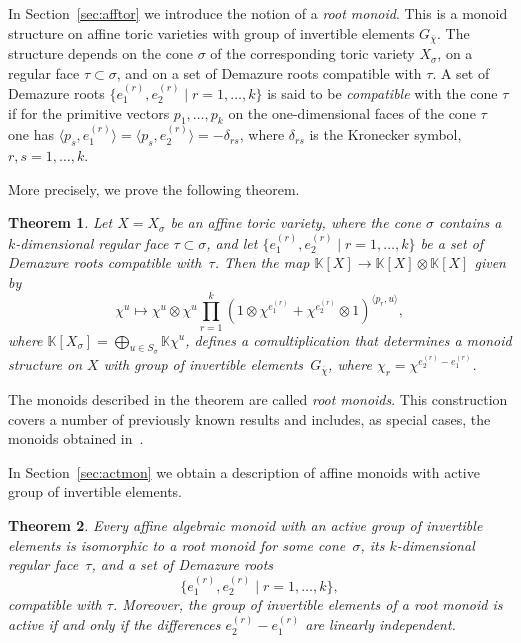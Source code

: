 \documentclass[a4paper, 11pt]{amsart}
\theoremstyle{plain}
\newtheorem{theorem}{Theorem}[section]
\theoremstyle{remark}
\theoremstyle{definition}
\newcommand{\KK}{\mathbb{K}}
\newcommand{\GG}{G_{\overline{\chi}}}
\begin{document}
In Section~\ref{sec:afftor} we introduce the notion of a \textit{root monoid}. This is a monoid structure on affine toric varieties with group of invertible elements $\GG$. The structure depends on the cone $\sigma$ of the corresponding toric variety $X_\sigma$, on a regular face $\tau \subset \sigma$, and on a set of Demazure roots compatible with $\tau$. A set of Demazure roots $\{e_1^{(r)}, e_2^{(r)} \mid r = 1,\ldots,k\}$ is said to be \emph{compatible} with the cone $\tau$ if for the primitive vectors $p_1, \ldots, p_k$ on the one-dimensional faces of the cone $\tau$ one has $\langle p_s, e_1^{(r)} \rangle = \langle p_s, e_2^{(r)} \rangle = -\delta_{rs}$, where $\delta_{rs}$ is the Kronecker symbol, $r, s = 1, \ldots, k$. 

\smallskip

More precisely, we prove the following theorem.

\begin{theorem}\label{thm111}
	Let $X = X_\sigma$ be an affine toric variety, where the cone $\sigma$ contains a $k$-dimensional regular face $\tau \subset \sigma$, and let $\{e_1^{(r)}, e_2^{(r)} \mid r = 1,\ldots,k \}$ be a set of Demazure roots compatible with~$\tau$. Then the map $\KK[X] \rightarrow \KK[X] \otimes \KK[X]$ given by 
	\begin{equation}\label{thm:finalcom1}
		\chi^u \mapsto \chi^u \otimes \chi^u \prod_{r = 1}^{k} (1 \otimes \chi^{e_1^{(r)}}  + \chi^{e_2^{(r)}} \otimes 1)^{\langle p_r, u\rangle},
	\end{equation}
	where $\KK[X_\sigma] = \bigoplus_{u \in S_\sigma} \KK \chi^u$, defines a comultiplication that determines a monoid structure on $X$ with group of invertible elements~$\GG$, where $\chi_r = \chi^{e_2^{(r)} - e_1^{(r)}}$. 
\end{theorem}
The monoids described in the theorem are called \emph{root monoids}. This construction covers a number of previously known results and includes, as special cases, the monoids obtained in~\cite{DZ,Bil,YZ}.

In Section~\ref{sec:actmon} we obtain a description of affine monoids with active group of invertible elements.
\begin{theorem}
	Every affine algebraic monoid with an active group of invertible elements is isomorphic to a root monoid for some cone~$\sigma$, its $k$-dimensional regular face~$\tau$, and a set of Demazure roots \[\{e_1^{(r)}, e_2^{(r)} \mid r = 1, \ldots, k\},\] compatible with $\tau$. Moreover, the group of invertible elements of a root monoid is active if and only if the differences $e_2^{(r)} - e_1^{(r)}$ are linearly independent.
\end{theorem}
\end{document}
